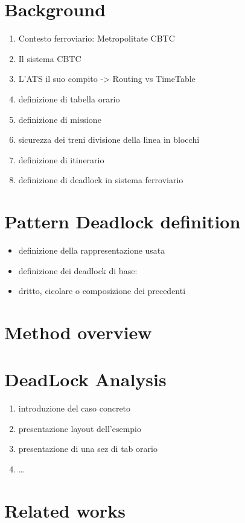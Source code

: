 \documentclass{ewic}
\begin{document}
\section{Background}
%
\begin{enumerate}
\item Contesto ferroviario: Metropolitate CBTC
\item Il sistema CBTC
\item L'ATS il suo compito -> Routing vs TimeTable
\item definizione di tabella orario
\item definizione di missione
\item sicurezza dei treni divisione della linea in blocchi
\item definizione di itinerario 
\item definizione di deadlock in sistema ferroviario
\end{enumerate}



\section{Pattern Deadlock definition}
\begin{itemize}
\item definizione della rappresentazione usata
\item definizione dei deadlock di base:
\item dritto, cicolare o composizione dei precedenti
\end{itemize}

\section{Method overview}


\section{DeadLock Analysis}
\begin{enumerate}
\item introduzione del caso concreto
\item presentazione layout dell'esempio
\item presentazione di una sez di tab orario
\item \ldots
\end{enumerate}
%

\section{Related works}
%
\end{document}

